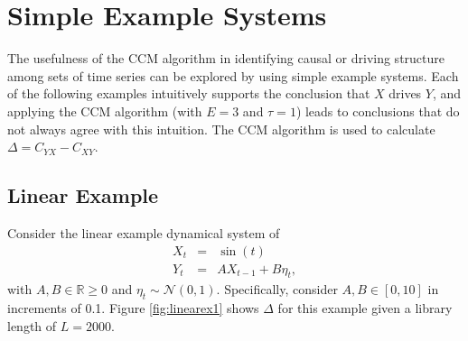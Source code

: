 \documentclass[twocolumn,aps,pre,groupedaddress]{revtex4-1}
\begin{document}
\section{Simple Example Systems}
The usefulness of the CCM algorithm in identifying causal or driving structure among sets of time series can be explored by using simple example systems.  Each of the following examples intuitively supports the conclusion that $X$ drives $Y$, and applying the CCM algorithm (with $E=3$ and $\tau=1$) leads to conclusions that do not always agree with this intuition.  The CCM algorithm is used to calculate $\Delta = C_{YX}-C_{XY}$.  

\subsection{Linear Example}
Consider the linear example dynamical system of
\begin{eqnarray}
\label{eq:linearex}
X_t &=& \sin(t)\\
Y_t &=& AX_{t-1}+B\eta_t,
\end{eqnarray}
with $A,B\in\mathbb{R}\ge 0$ and $\eta_t\sim\mathcal{N}\left(0,1\right)$.  Specifically, consider $A,B\in[0,10]$ in increments of 0.1.  Figure \ref{fig:linearex1} shows $\Delta$ for this example given a library length of $L=2000$.
\end{document}
